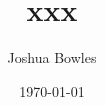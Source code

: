 \documentclass[11pt,twoside]{article}
\begin{document}
\author{Joshua Bowles}
\title{xxx}
\date{\today}


\maketitle
\end{document}
